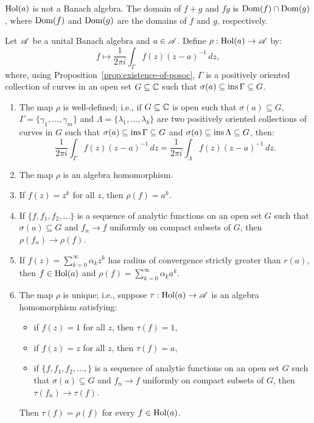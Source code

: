 \begin{remark}
	$\operatorname{Hol}(a)$ is not a Banach algebra. The domain of $f+g$ and $fg$ is $\operatorname{Dom}(f) \cap \operatorname{Dom}(g)$, where $\operatorname{Dom}(f)$ and $\operatorname{Dom}(g)$ are the domains of $f$ and $g$, respectively.
\end{remark}

\begin{theorem}
	Let $\mathscr{A}$ be a unital Banach algebra and $a \in \mathscr{A}$. Define $\rho:\operatorname{Hol}(a) \rightarrow \mathscr{A}$ by:
	\[
		f \mapsto \frac{1}{2 \pi i}\int_{\Gamma}^{} f(z)(z-a)^{-1}\,dz,
	\] 
	where, using Proposition~\ref{prop:existence-of-posoc}, $\Gamma$ is a positively oriented collection of curves in an open set $G \subseteq \mathbb{C}$ such that $\sigma(a) \subseteq \operatorname{ins} \Gamma \subseteq G$.
	\mbox{}
	\begin{enumerate}[label = (\alph*),itemsep=1pt,topsep=3pt]
		\item The map $\rho$ is well-defined; i.e., if $G \subseteq \mathbb{C}$ is open such that $\sigma(a) \subseteq G$, $\Gamma = \{\gamma_1,\ldots ,\gamma_m\}$ and $\Lambda = \{\lambda_1,\ldots ,\lambda_k\}$ are two positively oriented collections of curves in $G$ such that $\sigma(a) \subseteq \operatorname{ins} \Gamma \subseteq G$ and $\sigma(a) \subseteq \operatorname{ins} \Lambda \subseteq G$, then:
			\[
				\frac{1}{2 \pi i}\int_{\Gamma}^{} f(z)(z-a)^{-1}\,dz = \frac{1}{2 \pi i} \int_{\Lambda}^{} f(z)(z-a)^{-1}\,dz. 
			\]

		\item The map $\rho$ is an algebra homomorphism.
		\item If $f(z) = z^k$ for all $z$, then $\rho(f) = a^k$.
		\item If $\{f,f_1,f_2,\ldots \}$ is a sequence of analytic functions on an open set $G$ such that $\sigma(a) \subseteq G$ and $f_n \rightarrow f$ uniformly on compact subsets of $G$, then $\rho(f_n) \rightarrow \rho(f)$.

		\item If $f(z) = \sum_{k=0}^{\infty} \alpha_k z^k$ has radius of convergence strictly greater than $r(a)$, then $f \in \operatorname{Hol}(a)$ and $\rho(f) = \sum_{k=0}^{\infty}\alpha_k a^k$.


		\item The map $\rho$ is unique; i.e., suppose $\tau:\operatorname{Hol}(a) \rightarrow \mathscr{A}$ is an algebra homomorphism satisfying:
			\mbox{}
			\begin{itemize}[label=\(\scriptscriptstyle\bullet\), itemsep=1pt,topsep=3pt]
				\item if $f(z) = 1$ for all $z$, then $\tau(f) = 1$,
				\item if $f(z) = z$ for all $z$, then $\tau(f) = a$,
				\item if $\{f,f_1,f_2,\ldots ,\}$ is a sequence of analytic functions on an open set $G$ such that $\sigma(a) \subseteq G$ and $f_n \rightarrow f$ uniformly on compact subsets of $G$, then $\tau(f_n) \rightarrow \tau(f)$.
			\end{itemize}
		Then $\tau(f) = \rho(f)$ for every $f \in \operatorname{Hol}(a)$.
	\end{enumerate}
\end{theorem}
